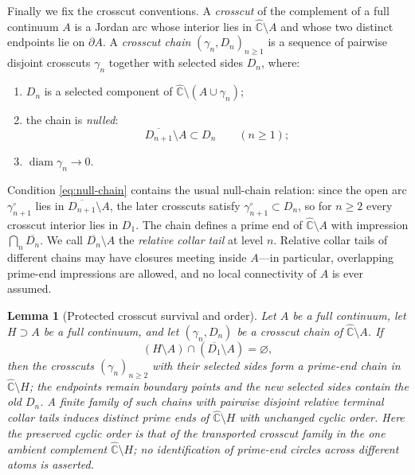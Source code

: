 \documentclass[11pt,reqno]{amsart}
\numberwithin{equation}{section}
\theoremstyle{plain}
\newtheorem{lemma}[theorem]{Lemma}
\theoremstyle{definition}
\theoremstyle{remark}
\newcommand{\Chat}{\widehat{\mathbb C}}
\begin{document}
Finally we fix the crosscut conventions.  A \emph{crosscut} of the
complement of a full continuum $A$ is a Jordan arc whose interior lies
in $\Chat\setminus A$ and whose two distinct endpoints lie on
$\partial A$.  A \emph{crosscut chain} $(\gamma_n,D_n)_{n\ge1}$ is a
sequence of pairwise disjoint crosscuts $\gamma_n$ together with
selected sides $D_n$, where:
\begin{enumerate}[label=\textup{(C\arabic*)},leftmargin=3.2em]
 \item \label{C1} $D_n$ is a selected component of
  $\Chat\setminus(A\cup\gamma_n)$;
 \item \label{C2} the chain is \emph{nulled}:
  \begin{equation}
   \overline{D_{n+1}}\setminus A\subset D_n
   \qquad(n\ge1);
  \label{eq:null-chain}
  \end{equation}
 \item \label{C3} $\operatorname{diam}\gamma_n\to0$.
\end{enumerate}
Condition \eqref{eq:null-chain} contains the usual null-chain relation:
since the open arc $\gamma_{n+1}^\circ$ lies in
$\overline{D_{n+1}}\setminus A$, the later crosscuts satisfy
$\gamma_{n+1}^\circ\subset D_n$, so for $n\ge2$ every crosscut interior
lies in $D_1$.  The chain defines a prime end of $\Chat\setminus A$
with impression $\bigcap_n\overline{D_n}$.  We call
$\overline{D_n}\setminus A$ the \emph{relative collar tail} at level
$n$.  Relative collar tails of different chains may have closures
meeting inside $A$---in particular, overlapping prime-end impressions
are allowed, and no local connectivity of $A$ is ever assumed.

\begin{lemma}[Protected crosscut survival and order]
\label{lem:crosscut-survival}
Let $A$ be a full continuum, let $H\supset A$ be a full continuum, and
let $(\gamma_n,D_n)$ be a crosscut chain of $\Chat\setminus A$.  If
\begin{equation}
 (H\setminus A)\cap(\overline{D_1}\setminus A)=\varnothing,
\label{eq:collar-clearance}
\end{equation}
then the crosscuts $(\gamma_n)_{n\ge2}$ with their selected sides form
a prime-end chain in $\Chat\setminus H$; the endpoints remain boundary
points and the new selected sides contain the old $D_n$.  A finite
family of such chains with pairwise disjoint relative terminal collar
tails induces distinct prime ends of $\Chat\setminus H$ with unchanged
cyclic order.  Here the preserved cyclic order is that of the
transported crosscut family in the one ambient complement
$\Chat\setminus H$; no identification of prime-end circles across
different atoms is asserted.
\end{lemma}
\end{document}
